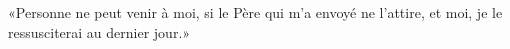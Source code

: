 \encetemps \jesusfoulejuifs
	«Personne ne peut venir à moi, si le Père qui m’a envoyé ne l’attire,
	et moi, je le ressusciterai au dernier jour.»

